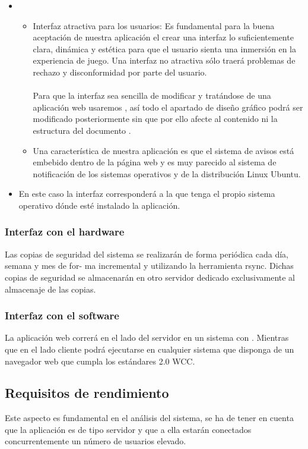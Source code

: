 \begin{itemize}
\item {}
  \begin{itemize}
  \item Interfaz atractiva para los usuarios: Es fundamental para la buena
    aceptación de nuestra aplicación el crear una interfaz lo suficientemente
    clara, dinámica y estética para que el usuario sienta una inmersión en la
    experiencia de juego. Una interfaz no atractiva sólo traerá problemas de
    rechazo y disconformidad por parte del usuario.\\\\
    Para que la interfaz sea sencilla de modificar y tratándose de una
    aplicación web usaremos , así todo el apartado
    de diseño gráfico podrá ser modificado posteriormente sin que por ello
    afecte al contenido ni la estructura del documento .
  \item Una característica de nuestra aplicación es que el sistema de avisos
    está embebido dentro de la página web y es muy parecido al sistema de
    notificación de los sistemas operativos  y de la \cursiva
    {distribución Linux Ubuntu}.
  \end{itemize}
\item {} En este caso la interfaz corresponderá a la que
  tenga el propio sistema operativo dónde esté instalado la aplicación.
\end{itemize}
\subsubsection{Interfaz con el hardware}
Las copias de seguridad del sistema se realizarán de forma periódica cada día, semana y mes de for-
ma incremental y utilizando la herramienta rsync. Dichas copias de seguridad se almacenarán en otro
servidor dedicado exclusivamente al almacenaje de las copias.

\subsubsection{Interfaz con el software}
La aplicación web correrá en el lado del servidor en un sistema 
con . Mientras que en el lado cliente podrá
ejecutarse en cualquier sistema que disponga de un navegador web que cumpla los
estándares 2.0 WCC.

\subsection{Requisitos de rendimiento}
Este aspecto es fundamental en el análisis del sistema, se ha de tener en cuenta que la aplicación es de
tipo servidor y que a ella estarán conectados concurrentemente un número de
usuarios elevado.

